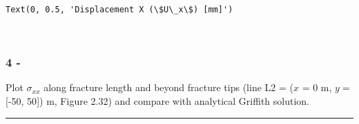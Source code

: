 \documentclass[8pt]{extarticle}
\makeatletter
\newcommand{\boxspacing}{\kern\kvtcb@left@rule\kern\kvtcb@boxsep}
\newcommand{\prompt}[4]{
        {\ttfamily\llap{{\color{#2}[#3]:\hspace{3pt}#4}}\vspace{-\baselineskip}}
    }
\makeatother
\begin{document}
            \begin{tcolorbox}[breakable, size=fbox, boxrule=.5pt, pad at break*=1mm, opacityfill=0]
\prompt{Out}{outcolor}{29}{\boxspacing}
\begin{Verbatim}[commandchars=\\\{\}]
Text(0, 0.5, 'Displacement X (\$U\_x\$) [mm]')
\end{Verbatim}
\end{tcolorbox}
        
    \begin{center}
    \end{center}
    { \hspace*{\fill} \\}
    
    \hypertarget{section*}{%
\subsubsection*{4 -}\label{section}}

Plot \(\sigma_{xx}\) along fracture length and beyond fracture tips
(line L2 = (\(x\) = 0 m, \(y=\) {[}-50, 50{]}) m, Figure 2.32) and
compare with analytical Griffith solution.

\begin{center}\rule{0.5\linewidth}{0.5pt}\end{center}
\end{document}
